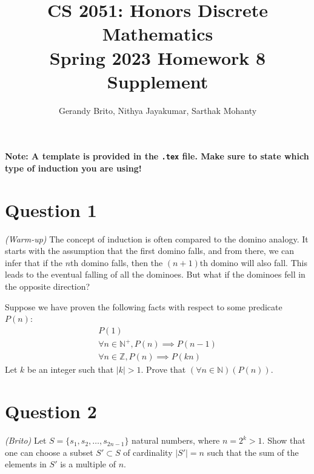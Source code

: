 \documentclass{article}
\title{\vspace{-1cm}CS 2051: Honors Discrete Mathematics \\Spring 2023 Homework 8 Supplement}
\author{Gerandy Brito, Nithya Jayakumar, Sarthak Mohanty}
\date{}
\begin{document}
\maketitle

\textbf{Note: A template is provided in the \texttt{.tex} file. Make sure to state which type of induction you are using!}

\section*{Question 1}
    \textit{(Warm-up)} The concept of induction is often compared to the domino analogy. It starts with the assumption that the first domino falls, and from there, we can infer that if the $n$th domino falls, then the $(n + 1)$th domino will also fall. This leads to the eventual falling of all the dominoes. But what if the dominoes fell in the opposite direction? 
    
    \vspace{2mm}
    Suppose we have proven the following facts with respect to some predicate $P(n)$:
    \begin{gather}
        P(1) \\
        \forall n \in \mathbb{N}^{+}, P(n) \implies P(n - 1) \\
        \forall n \in \mathbb{Z}, P(n) \implies P(kn)
    \end{gather}
    Let $k$ be an integer such that $|k| > 1$. Prove that $(\forall n \in \mathbb{N})(P(n))$.

\section*{Question 2 }
    \textit{(Brito)} Let $S=\{s_1,s_2,\ldots, s_{2n-1}\}$ natural numbers, where $n=2^k>1$. Show that one can choose a subset $S'\subset S$ of cardinality $|S'|=n$ such that the sum of the elements in $S'$ is a multiple of $n$.




\end{document}
